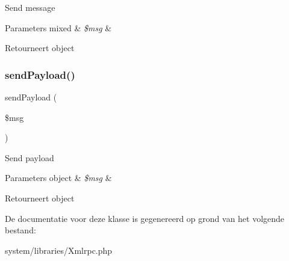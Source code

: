 Send message


\begin{DoxyParams}[1]{Parameters}
mixed & {\em \$msg} & \\
\hline
\end{DoxyParams}
\begin{DoxyReturn}{Retourneert}
object 
\end{DoxyReturn}
\mbox{\label{class_x_m_l___r_p_c___client_a040f0b8dcbcaac6a33ca0541befed955}} 
\subsubsection{\texorpdfstring{sendPayload()}{sendPayload()}}
{\footnotesize\ttfamily send\+Payload (\begin{DoxyParamCaption}\item[{}]{\$msg }\end{DoxyParamCaption})}

Send payload


\begin{DoxyParams}[1]{Parameters}
object & {\em \$msg} & \\
\hline
\end{DoxyParams}
\begin{DoxyReturn}{Retourneert}
object 
\end{DoxyReturn}


De documentatie voor deze klasse is gegenereerd op grond van het volgende bestand\+:\begin{DoxyCompactItemize}
\item 
system/libraries/Xmlrpc.\+php\end{DoxyCompactItemize}
